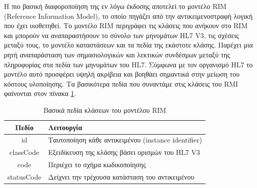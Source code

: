 		Η πιο βασική διαφοροποίηση της εν λόγω έκδοσης αποτελεί το μοντέλο RIM (Reference Information Model), το οποίο πηγάζει από την αντικειμενοστραφή λογική που έχει υιοθετηθεί\cite{HL7RIM}. Το μοντέλο RIM περιγράφει τις κλάσεις που ανήκουν στο RIM και μπορούν να αναπαραστήσουν το σύνολο των μηνυμάτων HL7 V3, τις σχέσεις μεταξύ τους, το μοντέλο καταστάσεων και τα πεδία της εκάστοτε κλάσης. Παρέχει μια ρητή αναπαράσταση των σημασιολογικών και λεκτικών συνδέσμων μεταξύ της πληροφορίας στα πεδία των μηνυμάτων του HL7. Σύμφωνα με τον οργανισμό HL7 το μοντέλο αυτό προσφέρει υψηλή ακρίβεια και βοηθάει σημαντικά στην μείωση του κόστους υλοποίησης. Τα βασικότερα πεδία που συναντάμε στις κλάσεις του RMI φαίνονται στον πίνακα \ref{tab:HL7_V3_RMI_fields}. \label{par:about_RIM}
	\begin{table}[h]
		\begin{center}
		    \begin{tabular}{|c|l|}
		    \hline
		    \rowcolor{grayy}
		    \textbf{Πεδίο} & \textbf{Λειτουργία}
		    \\ \hline
		     id & Ταυτοποίηση κάθε αντικειμένου (instance identifier)
		     \\ \hline
		     classCode & Εξειδίκευση της κλάσης βάσει ορισμών του HL7 V3
		     \\ \hline
		     code & Περιέχει το σχήμα κωδικοποίησης
		     \\ \hline
		     statusCode & Δείχνει την τρέχουσα κατάσταση του αντικειμένου
		     \\ \hline
		    \end{tabular}
		    \caption{Βασικά πεδία κλάσεων του μοντέλου RIM}
			\label{tab:HL7_V3_RMI_fields}
		\end{center}
	\end{table}
	
